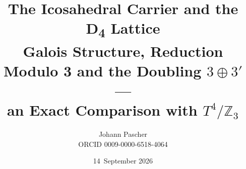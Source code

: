 \documentclass[11pt,a4paper]{report}
\title{The Icosahedral Carrier and the D\textsubscript{4} Lattice\\[0.5em]
  \large Galois Structure, Reduction Modulo 3 and the Doubling $3\oplus3'$ ---\\ an Exact Comparison with $T^4/\mathbb{Z}_3$}
\date{14~September 2026}
\author{Johann Pascher\\\small ORCID 0009-0000-6518-4064}
\begin{document}
\renewcommand{\thechapter}{}
\renewcommand{\thesection}{\arabic{section}}
\maketitle
\tableofcontents

\end{document}

